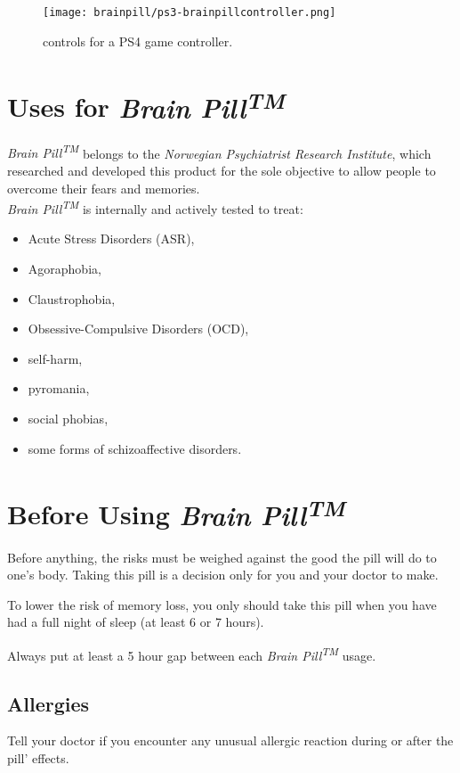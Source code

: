 \documentclass[10.5pt]{article}
\newcommand{\tm}{\emph{Brain Pill\nth{TM} }}
\newcommand{\nth}{\textsuperscript}
\begin{document}
    \begin{figure}[H]
    	\centering
      \texttt{[image: brainpill/ps3-brainpillcontroller.png]}
      \caption[Close up of {Hemidactylus}]{controls for a PS4 game controller.}
    \end{figure}
  
  \section{Uses for \tm}
  \tm belongs to the \emph{Norwegian Psychiatrist Research Institute}, 
  which researched and developed this product for the sole objective 
  to allow people to overcome their fears and memories.\\
  
  \tm is internally and actively tested to treat:
  
  \begin{itemize}
    \setlength\itemsep{.25em}
    
    \item Acute Stress Disorders (ASR),
    \item Agoraphobia, 
    \item Claustrophobia,
    \item Obsessive-Compulsive Disorders (OCD),
    \item self-harm,
    \item pyromania, 
    \item social phobias,
    \item some forms of schizoaffective disorders.
  \end{itemize}
  
  \section{Before Using \tm}
  Before anything, the risks must be weighed against the good the pill will do to one's body.
  Taking this pill is a decision only for you and your doctor to make.
  
  To lower the risk of memory loss, 
  you only should take this pill when you have had a full night of sleep (at least 6 or 7 hours).
  
  Always put at least a 5 hour gap between each \tm usage.
  
  \subsection{Allergies}
    Tell your doctor if you encounter any unusual allergic reaction during 
    or after the pill' effects.
    
\end{document}
